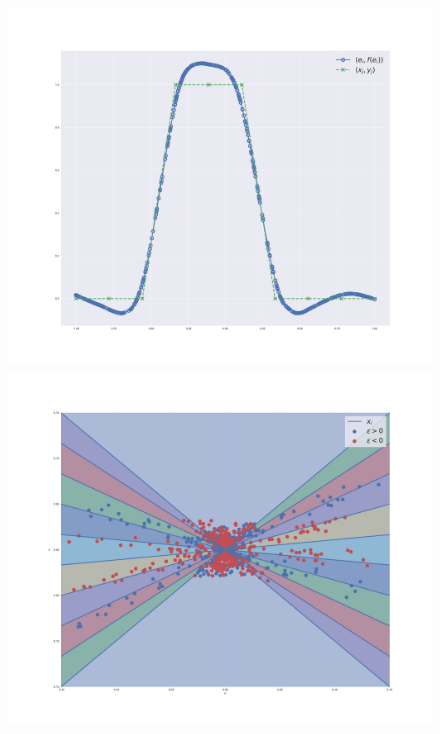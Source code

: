 \begin{figure}
    \centering
    \includegraphics[width=\linewidth]{figures/radial_trajectories_recon.pdf}
    \endminipage\hfill
    \includegraphics[width=\linewidth]{figures/radial_trajectories_phase.pdf}
    \endminipage\hfill

\end{figure}
